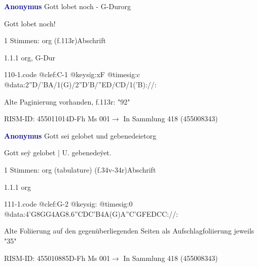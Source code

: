 \documentclass[twocolumn, 12pt]{book}
\begin{document}
\par \vspace{16pt} \textcolor{darkblue}{\textbf{Anonymus  }}\hfillplus{\textbf{[110]}}\newline Gott lobet noch - G-Dur\newline org
\par \begin{itshape}[f.113r, heading:] Gott lobet noch!\end{itshape} 
\par \textcolor{darkblue}{}  1 Stimmen: org  (f.113r)\newline Abschrift
\par 1.1.1  org, G-Dur  
\begin{filecontents*}{110-1.code}
@clef:C-1
@keysig:xF
@timesig:c
@data:2''D/'BA/1(G)/2''D'B/''ED/CD/1('B)://:
\end{filecontents*}
\newline %
\par Alte Paginierung vorhanden, f.113r: "92"
\par RISM-ID: 455011014\newline D-Fh  Ms 001\newline $\rightarrow$ In Sammlung 418 (455008343)
      
\par \vspace{16pt} \textcolor{darkblue}{\textbf{Anonymus  }}\hfillplus{\textbf{[111]}}\newline Gott sei gelobet und gebenedeiet\newline org
\par \begin{itshape}[f.34v, at left:] Gott seÿ gelobet | U. gebenedeÿet.\end{itshape} 
\par \textcolor{darkblue}{}  1 Stimmen: org (tabulature)  (f.34v-34r)\newline Abschrift
\par 1.1.1  org  
\begin{filecontents*}{111-1.code}
@clef:G-2
@keysig:
@timesig:0
@data:4'G{8GG}4AG{8.6''CDC'B}4A(G)A''C'GFEDCC://:
\end{filecontents*}
\newline %
\par Alte Foliierung auf den gegenüberliegenden Seiten als Aufschlagfoliierung jeweils "35"
\par RISM-ID: 455010885\newline D-Fh  Ms 001\newline $\rightarrow$ In Sammlung 418 (455008343)
      
\end{document}
